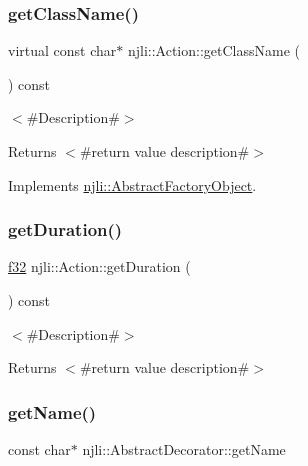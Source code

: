 \subsubsection{\texorpdfstring{get\+Class\+Name()}{getClassName()}}
{\footnotesize\ttfamily virtual const char$\ast$ njli\+::\+Action\+::get\+Class\+Name (\begin{DoxyParamCaption}{ }\end{DoxyParamCaption}) const\hspace{0.3cm}{\ttfamily [virtual]}}

$<$\#\+Description\#$>$

\begin{DoxyReturn}{Returns}
$<$\#return value description\#$>$ 
\end{DoxyReturn}


Implements \mbox{\hyperlink{classnjli_1_1_abstract_factory_object_af4151e41b80d5bc3fc42822c67fc2278}{njli\+::\+Abstract\+Factory\+Object}}.

\mbox{\label{classnjli_1_1_action_a3473d3b336d30b21976a8aa14f105b50}} 
\subsubsection{\texorpdfstring{get\+Duration()}{getDuration()}}
{\footnotesize\ttfamily \mbox{\hyperlink{_util_8h_a5f6906312a689f27d70e9d086649d3fd}{f32}} njli\+::\+Action\+::get\+Duration (\begin{DoxyParamCaption}{ }\end{DoxyParamCaption}) const}

$<$\#\+Description\#$>$

\begin{DoxyReturn}{Returns}
$<$\#return value description\#$>$ 
\end{DoxyReturn}
\mbox{\label{classnjli_1_1_action_ad41266885be835f3ee602311e20877a4}} 
\subsubsection{\texorpdfstring{get\+Name()}{getName()}}
{\footnotesize\ttfamily const char$\ast$ njli\+::\+Abstract\+Decorator\+::get\+Name}

